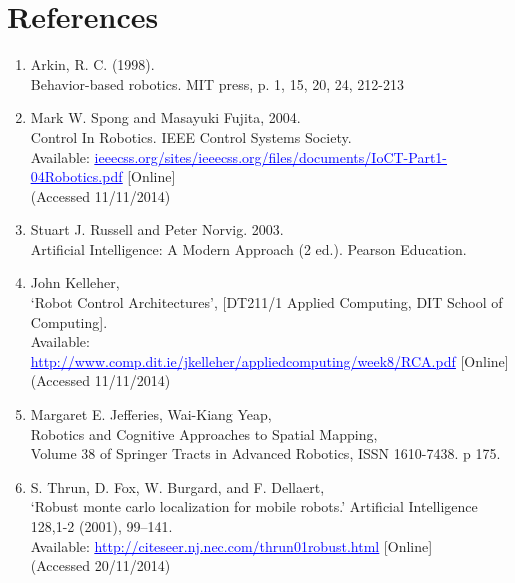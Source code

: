 \documentclass{article}
\begin{document}
\section{References}
\begin{enumerate}

\item Arkin, R. C. (1998).
\\Behavior-based robotics. MIT press, p. 1, 15, 20, 24, 212-213

\item Mark W. Spong and Masayuki Fujita, 2004.
\\Control In Robotics. IEEE Control Systems Society. \\Available: \href{http://ieeecss.org/sites/ieeecss.org/files/documents/IoCT-Part1-04Robotics.pdf}{\textcolor{blue}{\uline{ieeecss.org/sites/ieeecss.org/files/documents/IoCT-Part1-04Robotics.pdf}}} [Online]
\\(Accessed 11/11/2014)

\item Stuart J. Russell and Peter Norvig. 2003.
\\Artificial Intelligence: A Modern Approach (2 ed.). Pearson Education.

\item John Kelleher,
\\‘Robot Control Architectures’,  [DT211/1 Applied Computing, DIT School of Computing].
\\Available: \href{http://www.comp.dit.ie/jkelleher/appliedcomputing/week8/RCA.pdf}{\textcolor{blue}{\uline{http://www.comp.dit.ie/jkelleher/appliedcomputing/week8/RCA.pdf}}} [Online]
\\(Accessed 11/11/2014)

\item Margaret E. Jefferies, Wai-Kiang Yeap,
\\Robotics and Cognitive Approaches to Spatial Mapping,
\\Volume 38 of Springer Tracts in Advanced Robotics, ISSN 1610-7438. p 175.

\item S. Thrun, D. Fox, W. Burgard, and F. Dellaert,
\\‘Robust monte carlo localization for mobile robots.’ Artificial Intelligence 128,1-2 (2001), 99–141.
\\Available: \href{http://citeseer.nj.nec.com/thrun01robust.html}{\textcolor{blue}{\uline{http://citeseer.nj.nec.com/thrun01robust.html}}} [Online]
\\(Accessed 20/11/2014)


\end{enumerate}
\end{document}
